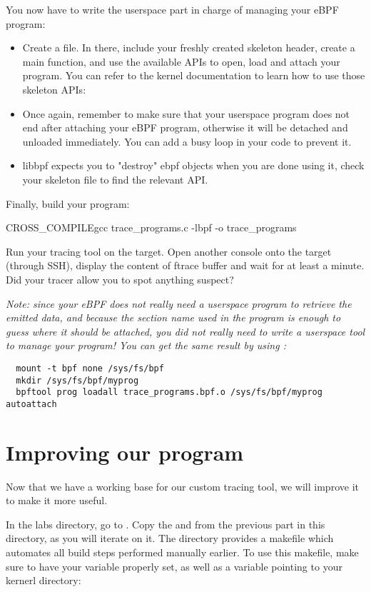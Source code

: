 You now have to write the userspace part in charge of managing your eBPF program:
\begin{itemize}
  \item Create a  file. In there, include your freshly created skeleton header, create a main function, and use the available APIs to open, load and attach your program. You can refer to the kernel documentation to learn how to use those skeleton APIs: 
  \item Once again, remember to make sure that your userspace program does not end after attaching your eBPF program, otherwise it will be detached and unloaded immediately. You can add a busy loop in your code to prevent it.
  \item libbpf expects you to "destroy" ebpf objects when you are done using it, check your skeleton file to find the relevant API.
\end{itemize}

Finally, build your program:
\begin{bashinput}
$ ${CROSS_COMPILE}gcc trace_programs.c -lbpf -o trace_programs
\end{bashinput}
Run your tracing tool on the target. Open another console onto the target (through SSH), display the content of ftrace buffer and wait for at least a minute. Did your tracer allow you to spot anything suspect?

{\em Note: since your eBPF does not really need a userspace program to retrieve
the emitted data, and because the section name used in the program is enough to
guess where it should be attached, you did not really need to write a userspace tool to manage
your program! You can get the same result by using :}
\begin{verbatim}
  mount -t bpf none /sys/fs/bpf
  mkdir /sys/fs/bpf/myprog
  bpftool prog loadall trace_programs.bpf.o /sys/fs/bpf/myprog autoattach
\end{verbatim}
\section{Improving our program}

Now that we have a working base for our custom tracing tool, we will improve it
to make it more useful.

In the labs directory, go to . Copy the
 and  from the previous
part in this directory, as you will iterate on it. The directory provides a
makefile which automates all build steps performed manually earlier. To use
this makefile, make sure to have your  variable
properly set, as well as a  variable pointing to your kernerl
directory:


